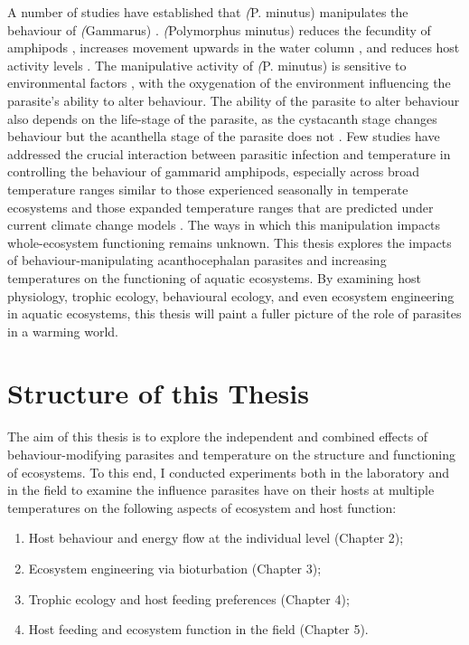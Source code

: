 A number of studies have established that \emph(P. minutus) manipulates the behaviour of \emph(Gammarus) \citep{kaldonski2008, perrot2016}. \emph(Polymorphus minutus) reduces the fecundity of amphipods \citep{dezfuli1999}, increases movement upwards in the water column \citep{perrot2016}, and reduces host activity levels \citep{jacquin2014}. The manipulative activity of \emph(P. minutus) is sensitive to environmental factors \citep{perrot2016}, with the oxygenation of the environment influencing the parasite’s ability to alter behaviour. The ability of the parasite to alter behaviour also depends on the life-stage of the parasite, as the cystacanth stage changes behaviour but the acanthella stage of the parasite does not \citep{bailly2017}. Few studies have addressed the crucial interaction between parasitic infection and temperature in controlling the behaviour of gammarid amphipods, especially across broad temperature ranges similar to those experienced seasonally in temperate ecosystems and those expanded temperature ranges that are predicted under current climate change models \citep{labaude2017, labaude2016}. The ways in which this manipulation impacts whole-ecosystem functioning remains unknown. This thesis explores the impacts of behaviour-manipulating acanthocephalan parasites and increasing temperatures on the functioning of aquatic ecosystems. By examining host physiology, trophic ecology, behavioural ecology, and even ecosystem engineering in aquatic ecosystems, this thesis will paint a fuller picture of the role of parasites in a warming world. 

\section{Structure of this Thesis}

The aim of this thesis is to explore the independent and combined effects of behaviour-modifying parasites and temperature on the structure and functioning of ecosystems. To this end, I conducted experiments both in the laboratory and in the field to examine the influence parasites have on their hosts at multiple temperatures on the following aspects of ecosystem and host function: 

\begin{enumerate}
\item	Host behaviour and energy flow at the individual level (Chapter 2); 
\item	Ecosystem engineering via bioturbation  (Chapter 3); 
\item	Trophic ecology and host feeding preferences  (Chapter 4); 
\item	Host feeding and ecosystem function in the field (Chapter 5).
\end{enumerate}


